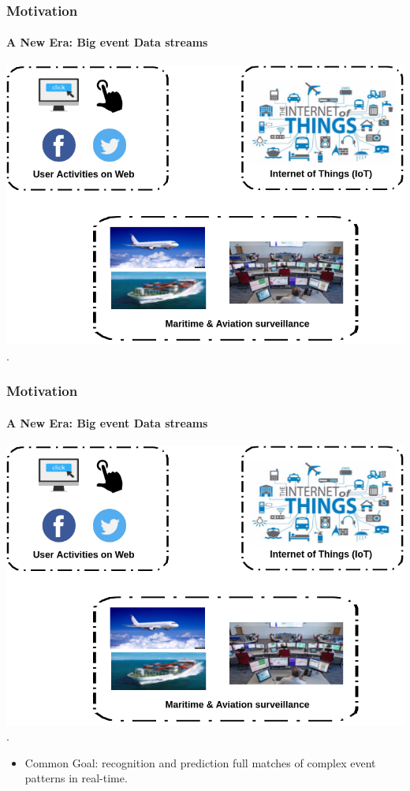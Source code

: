 



\frame
{
	\frametitle{Motivation}
	\framesubtitle{A New Era: Big event Data streams}
		\begin{center}
		\includegraphics[scale=.36]{figures/motiv.png}\\
		.
	\end{center}
}


\frame
{
\frametitle{Motivation}
\framesubtitle{A New Era: Big event Data streams}
\begin{center}
	\includegraphics[scale=.3]{figures/motiv.png}\\
	.
\end{center}
	

	\begin{itemize}[]
		
		\item<1-> Common Goal: recognition and prediction full matches of complex event patterns in real-time.
		
	\end{itemize}
}


